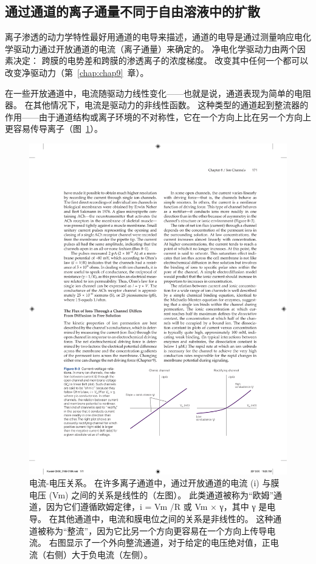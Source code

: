\subsection{通过通道的离子通量不同于自由溶液中的扩散}

离子渗透的动力学特性最好用通道的电导来描述，通道的电导是通过测量响应电化学驱动力通过开放通道的电流（离子通量）来确定的。
净电化学驱动力由两个因素决定：
跨膜的电势差和跨膜的渗透离子的浓度梯度。
改变其中任何一个都可以改变净驱动力（第~\ref{chap:chap9}~章）。


在一些开放通道中，电流随驱动力线性变化——也就是说，通道表现为简单的电阻器。
在其他情况下，电流是驱动力的非线性函数。
这种类型的通道起到整流器的作用——由于通道结构或离子环境的不对称性，它在一个方向上比在另一个方向上更容易传导离子（图~\ref{fig:8_3}）。


\begin{figure}[htbp]
	\centering
	\includegraphics[width=1.0\linewidth]{chap08/fig_8_3}
	\caption{电流-电压关系。 在许多离子通道中，通过开放通道的电流 (i) 与膜电压 (Vm) 之间的关系是线性的（左图）。 此类通道被称为“欧姆”通道，因为它们遵循欧姆定律，i = Vm /R 或 Vm × γ，其中 γ 是电导。 在其他通道中，电流和膜电位之间的关系是非线性的。 这种通道被称为“整流”，因为它比另一个方向更容易在一个方向上传导电流。 右图显示了一个外向整流通道，对于给定的电压绝对值，正电流（右侧）大于负电流（左侧）。}
	\label{fig:8_3}
\end{figure}



